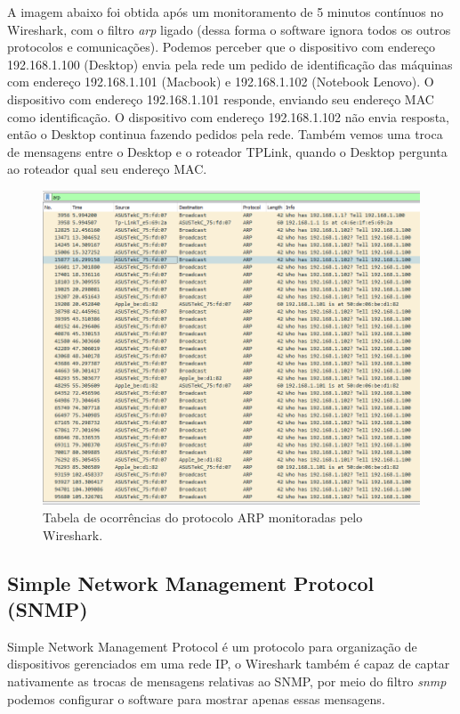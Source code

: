 \documentclass[12pt]{article}
\begin{document}
A imagem abaixo foi obtida após um monitoramento de 5 minutos contínuos no Wireshark, com o filtro \emph{arp} ligado (dessa forma o software ignora todos os outros protocolos e comunicações). Podemos perceber que o dispositivo com endereço 192.168.1.100 (Desktop) envia pela rede um pedido de identificação das máquinas com endereço 192.168.1.101 (Macbook) e 192.168.1.102 (Notebook Lenovo). O dispositivo com endereço 192.168.1.101 responde, enviando seu endereço MAC como identificação. O dispositivo com endereço 192.168.1.102 não envia resposta, então o Desktop continua fazendo pedidos pela rede. Também vemos uma troca de mensagens entre o Desktop e o roteador TPLink, quando o Desktop pergunta ao roteador qual seu endereço MAC.

\begin{figure}[H]
    \includegraphics[width=\linewidth]{wireshark_arp.png}
    \caption{Tabela de ocorrências do protocolo ARP monitoradas pelo Wireshark.}
\end{figure}

\subsection{Simple Network Management Protocol (SNMP)}

Simple Network Management Protocol é um protocolo para organização de dispositivos gerenciados em uma rede IP, o Wireshark também é capaz de captar nativamente as trocas de mensagens relativas ao SNMP, por meio do filtro \emph{snmp} podemos configurar o software para mostrar apenas essas mensagens.
\end{document}
